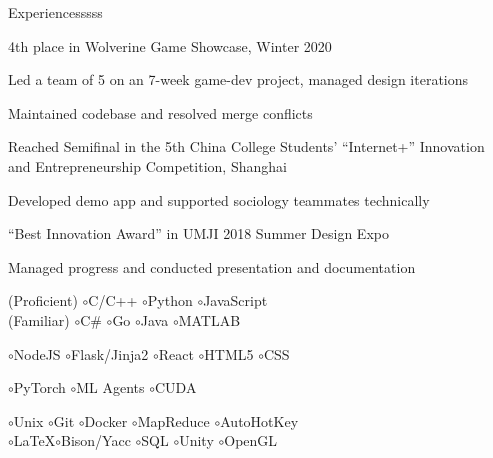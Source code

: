 \documentclass[12pt,a4paper]{article}
\newcommand{\datesmash}[1]{\hspace{\fill}{\smash{\textmd{$|$ #1 $|$}}}}
\newcommand{\bl}{\hspace{2px}$\circ$\hspace{5px}}
\begin{document}
\begin{labeling}{Experiencesssss}
\begin{compactlist2}
  \item 4th place in Wolverine Game Showcase, Winter 2020
  \datesmash{2020.4}
  \begin{compactlist2}
    \item Led a team of 5 on an 7-week game-dev project, managed design iterations
    \item Maintained codebase and resolved merge conflicts
  \end{compactlist2}

  \item Reached Semifinal in the 5th China College Students' ``Internet+'' Innovation\\ and Entrepreneurship Competition, Shanghai
  \datesmash{2019.5}
  \begin{compactlist2}
    \item Developed demo app and supported sociology teammates technically
  \end{compactlist2}

  \item ``Best Innovation Award'' in UMJI 2018 Summer Design Expo 
  \datesmash{2018.8}
  \begin{compactlist2}
    \item Managed progress and conducted presentation and documentation
  \end{compactlist2}

\end{compactlist2}

\item [\textbf{\parbox[b][9pt][t]{1.03in}{Skills}}]
\begin{compactlist1}
  \item {}
  (Proficient) \bl C/C++ \bl Python \bl JavaScript\\ \hspace{2cm}
  (Familiar) \bl C\# \bl Go \bl Java \bl MATLAB
  \item {}
  \bl NodeJS \bl Flask/Jinja2 \bl React \bl HTML5 \bl CSS
  \item {}
  \bl PyTorch \bl ML Agents \bl CUDA
  \item {}
  \bl Unix \bl Git \bl Docker \bl MapReduce \bl AutoHotKey\\ \hspace{2cm}
  \bl \LaTeX \bl Bison/Yacc \bl SQL \bl Unity \bl OpenGL
\end{compactlist1}

\end{labeling}
\end{document}
